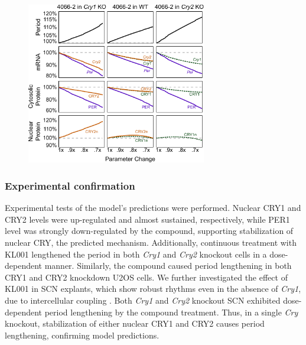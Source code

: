 \begin{figure}[bt]
    \centering
    \includegraphics[width=0.7\textwidth]{chap2/figures/prediction.pdf}
    \label{fig:40662prediction}
\end{figure}

\subsubsection{Experimental confirmation}
Experimental tests of the model's predictions were performed. 
Nuclear CRY1 and CRY2 levels were up-regulated and almost sustained, respectively, while PER1 level was strongly down-regulated by the compound, supporting stabilization of nuclear CRY, the predicted mechanism. 
Additionally, continuous treatment with KL001 lengthened the period in both {\it Cry1} and {\it Cry2} knockout cells in a dose-dependent manner. 
Similarly, the compound caused period lengthening in both CRY1 and CRY2 knockdown U2OS cells. 
We further investigated the effect of KL001 in SCN explants, which show robust rhythms even in the absence of {\it Cry1}, due to intercellular coupling \cite{Liu2007}. 
Both {\it Cry1} and {\it Cry2} knockout SCN exhibited dose-dependent period lengthening by the compound treatment. 
Thus, in a single {\it Cry} knockout, stabilization of either nuclear CRY1 and CRY2 causes period lengthening, confirming model predictions.

